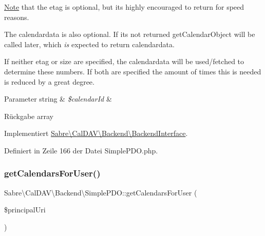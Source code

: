 \mbox{\hyperlink{class_note}{Note}} that the etag is optional, but it\textquotesingle{}s highly encouraged to return for speed reasons.

The calendardata is also optional. If it\textquotesingle{}s not returned \textquotesingle{}get\+Calendar\+Object\textquotesingle{} will be called later, which {\itshape is} expected to return calendardata.

If neither etag or size are specified, the calendardata will be used/fetched to determine these numbers. If both are specified the amount of times this is needed is reduced by a great degree.


\begin{DoxyParams}[1]{Parameter}
string & {\em \$calendar\+Id} & \\
\hline
\end{DoxyParams}
\begin{DoxyReturn}{Rückgabe}
array 
\end{DoxyReturn}


Implementiert \mbox{\hyperlink{interface_sabre_1_1_cal_d_a_v_1_1_backend_1_1_backend_interface_aaa786269ba9eb1731fb659b67f684ac2}{Sabre\textbackslash{}\+Cal\+D\+A\+V\textbackslash{}\+Backend\textbackslash{}\+Backend\+Interface}}.



Definiert in Zeile 166 der Datei Simple\+P\+D\+O.\+php.

\mbox{\label{class_sabre_1_1_cal_d_a_v_1_1_backend_1_1_simple_p_d_o_af10ea58aabe1645bc2a6d4845dccda12}} 
\subsubsection{\texorpdfstring{get\+Calendars\+For\+User()}{getCalendarsForUser()}}
{\footnotesize\ttfamily Sabre\textbackslash{}\+Cal\+D\+A\+V\textbackslash{}\+Backend\textbackslash{}\+Simple\+P\+D\+O\+::get\+Calendars\+For\+User (\begin{DoxyParamCaption}\item[{}]{\$principal\+Uri }\end{DoxyParamCaption})}


